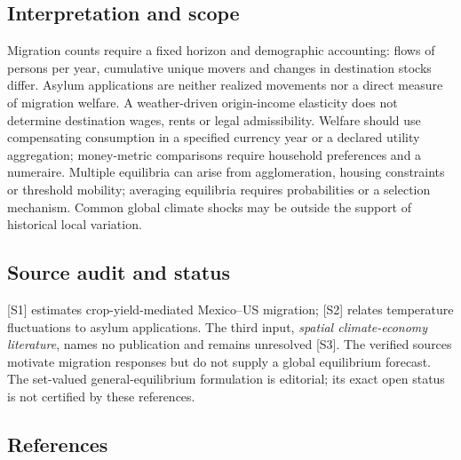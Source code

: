 \documentclass[11pt,a4paper]{article}
\begin{document}
\subsection*{Interpretation and scope}

Migration counts require a fixed horizon and demographic accounting: flows of persons per year, cumulative unique movers and changes in destination stocks differ. Asylum applications are neither realized movements nor a direct measure of migration welfare. A weather-driven origin-income elasticity does not determine destination wages, rents or legal admissibility. Welfare should use compensating consumption in a specified currency year or a declared utility aggregation; money-metric comparisons require household preferences and a numeraire. Multiple equilibria can arise from agglomeration, housing constraints or threshold mobility; averaging equilibria requires probabilities or a selection mechanism. Common global climate shocks may be outside the support of historical local variation.

\subsection*{Source audit and status}

[S1] estimates crop-yield-mediated Mexico--US migration; [S2] relates temperature fluctuations to asylum applications. The third input, \emph{spatial climate-economy literature}, names no publication and remains unresolved [S3]. The verified sources motivate migration responses but do not supply a global equilibrium forecast. The set-valued general-equilibrium formulation is editorial; its exact open status is not certified by these references.

\subsection*{References}
\end{document}
